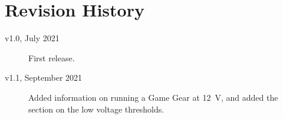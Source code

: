 \documentclass{article}
\begin{document}
\section{Revision History}
\begin{description}
\item[v1.0, July 2021] First release.
\item[v1.1, September 2021] Added information on running a Game Gear
  at \qty{12}{\volt}, and added the section on the low voltage thresholds.
\end{description}
\end{document}
